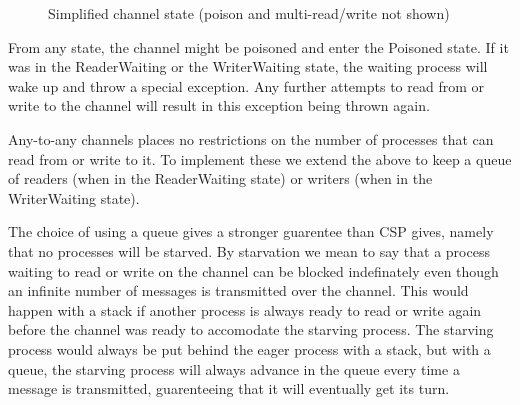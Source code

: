 \documentclass[a4paper,12pt]{article}
\begin{document}
\begin{figure}[h]
\centering
\caption{Simplified channel state (poison and multi-read/write not shown)}
\label{channel-state}
\end{figure}

From any state, the channel might be poisoned and enter the Poisoned state. If it was in the
ReaderWaiting or the WriterWaiting state, the waiting process will wake up and throw a special
exception. Any further attempts to read from or write to the channel will result in this 
exception being thrown again.

Any-to-any channels places no restrictions on the number of processes that can
read from or write to it. To implement these we extend the above to keep a queue
of readers (when in the ReaderWaiting state) or writers (when in the
WriterWaiting state).

The choice of using a queue gives a stronger guarentee than CSP gives, namely that no processes
will be starved. By starvation we mean to say that a process waiting to read or write on the
channel can be blocked indefinately even though an infinite number of messages is transmitted
over the channel. This would happen with a stack if another process is always ready to read or 
write again before the channel was ready to accomodate the starving process. The starving process
would always be put behind the eager process with a stack, but with a queue, the starving process
will always advance in the queue every time a message is transmitted, guarenteeing that it will
eventually get its turn.
\end{document}
